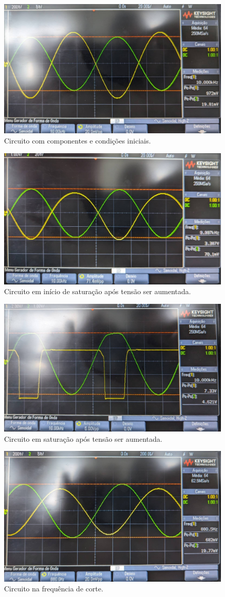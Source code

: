 \begin{figure}[H]
    \centering
    \includegraphics[width=0.5\columnwidth]{Images/ganho_do_circuito_normal.jpeg}
    \caption{Circuito com componentes e condições iniciais.}
\end{figure}

\begin{figure}[H]
    \centering
    \includegraphics[width=0.5\columnwidth]{Images/circuito_inicio_saturacao.jpeg}
    \caption{Circuito em início de saturação após tensão ser aumentada.}
\end{figure}


\begin{figure}[H]
    \centering
    \includegraphics[width=0.5\columnwidth]{Images/saturacao_amplitude.jpeg}
    \caption{Circuito em saturação após tensão ser aumentada.}
\end{figure}

\begin{figure}[H]
    \centering
    \includegraphics[width=0.5\columnwidth]{Images/frequencia_de_corte_baixa.jpeg}
    \caption{Circuito na frequência de corte.}
\end{figure}

